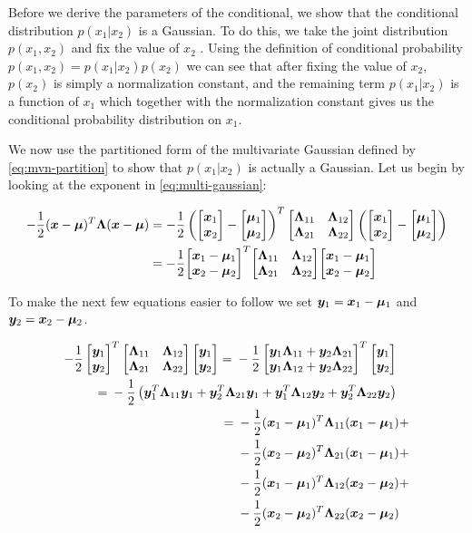 Before we derive the parameters of the conditional, we show that the conditional distribution $p(x_1 | x_2)$ is a Gaussian. To do this, we take the joint distribution $p(x_1, x_2)$ and fix the value of $x_2$ \citep{bishop2016pattern}. Using the definition of conditional probability $p(x_1, x_2) = p(x_1 | x_2) p(x_2)$ we can see that after fixing the value of $x_2$, $p(x_2)$ is simply a normalization constant, and the remaining term $p(x_1 | x_2)$ is a function of $x_1$ which together with the normalization constant gives us the conditional probability distribution on $x_1$.

We now use the partitioned form of the multivariate Gaussian defined by \eqref{eq:mvn-partition} to show that $p(x_1 | x_2)$ is actually a Gaussian. Let us begin by looking at the exponent in \eqref{eq:multi-gaussian}:

\begin{align}
-\frac{1}{2} ({\bm{x}} - {\bm{\mu}})^T {\bm{\Lambda}} ({\bm{x}} - {\bm{\mu}}) &= 
-\frac{1}{2} \left({\begin{bmatrix} {\bm{x}}_1 \\ {\bm{x}}_2 \end{bmatrix}} - {\begin{bmatrix} {\bm{\mu}}_1 \\ {\bm{\mu}}_2 \end{bmatrix}} \right)^T {\begin{bmatrix} {{\bm{\Lambda}}_{11}} & {{\bm{\Lambda}}_{12}} \\ {{\bm{\Lambda}}_{21}} & {{\bm{\Lambda}}_{22}} \end{bmatrix}} \left({\begin{bmatrix} {\bm{x}}_1 \\ {\bm{x}}_2 \end{bmatrix}} - {\begin{bmatrix} {\bm{\mu}}_1 \\ {\bm{\mu}}_2 \end{bmatrix}} \right) \\
&= -\frac{1}{2} {\begin{bmatrix} {\bm{x}}_1 - {\bm{\mu}}_1 \\ {\bm{x}}_2 - {\bm{\mu}}_2 \end{bmatrix}}^T {\begin{bmatrix} {{\bm{\Lambda}}_{11}} & {{\bm{\Lambda}}_{12}} \\ {{\bm{\Lambda}}_{21}} & {{\bm{\Lambda}}_{22}} \end{bmatrix}} {\begin{bmatrix} {\bm{x}}_1 - {\bm{\mu}}_1 \\ {\bm{x}}_2 - {\bm{\mu}}_2 \end{bmatrix}}
\end{align}

To make the next few equations easier to follow we set ${\bm{y}}_1 = {\bm{x}}_1 - {\bm{\mu}}_1$ and ${\bm{y}}_2 = {\bm{x}}_2 - {\bm{\mu}}_2$.

\begin{align}
\begin{split}
-\frac{1}{2} \begin{bmatrix} \vy_1 \\ \vy_2 \end{bmatrix} ^T \partlambda \begin{bmatrix} \vy_1 \\ \vy_2 \end{bmatrix} ={}& -\frac{1}{2} \begin{bmatrix} \vy_1 \ml{11} + \vy_2 \ml{21} \\ \vy_1 \ml{12} + \vy_2 \ml{22} \end{bmatrix} ^T \begin{bmatrix} \vy_1 \\ \vy_2 \end{bmatrix}
\end{split} \\
%
\begin{split}
={}& -\frac{1}{2} \left( \vy_1^T \ml{11} \vy_1 + \vy_2^T \ml{21} \vy_1 + \vy_1^T \ml{12} \vy_2 + \vy_2^T \ml{22} \vy_2 \right)
\end{split} \\
%
\begin{split}
={}& -\frac{1}{2} (\vx_1 - \vmu_1)^T \ml{11} (\vx_1 - \vmu_1) {}+ \\
  &-\frac{1}{2} (\vx_2 - \vmu_2)^T \ml{21} (\vx_1 - \vmu_1) {}+ \\
  &-\frac{1}{2} (\vx_1 - \vmu_1)^T \ml{12} (\vx_2 - \vmu_2) {}+ \\
  &-\frac{1}{2} (\vx_2 - \vmu_2)^T \ml{22} (\vx_2 - \vmu_2) \label{eq:mvn-quadratic-form}
\end{split}
\end{align}

